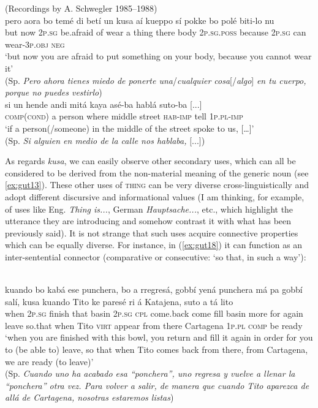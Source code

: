 \documentclass[output=paper,colorlinks,citecolor=brown]{langscibook}
\begin{document}
\ea\label{ex:gut16}(Recordings by A. Schwegler 1985--1988)\\
\gll pero aora bo temé di betí un kusa aí kueppo sí pokke bo polé biti-lo nu \\
but now 2\textsc{p.sg} be.afraid of wear a thing there body 2\textsc{p.sg.poss} because 2\textsc{p.sg} can wear-3\textsc{p.obj} \textsc{neg} \\
\glt ‘but now you are afraid to put something on your body, because you cannot wear it’ \\
(Sp. \textit{Pero ahora tienes miedo de ponerte una}/\textit{cualquier cosa}[/\textit{algo}] \textit{en tu cuerpo, porque no puedes vestirlo}) 
\ex \label{ex:gut17}\citep[209]{MagliaMoñino2015}\\
\gll si un hende andi mitá kaya asé-ba hablá suto-ba [...] \\
\textsc{comp}(\textsc{cond}) a person where middle street \textsc{hab-imp} tell 1\textsc{p.pl-imp} \\
\glt ‘if a person(/someone) in the middle of the street spoke to us, […]’ \\
(Sp. \textit{Si alguien en medio de la calle nos hablaba, }[...]) 
\z

As regards \textit{kusa}, we can easily observe other secondary uses, which can all be considered to be derived from the non-material meaning of the generic noun (see \ref{ex:gut13}). These other uses of \textsc{thing} can be very diverse cross-linguistically and adopt different discursive and informational values (I am thinking, for example, of uses like Eng. \textit{Thing is...}, German \textit{Hauptsache...}, etc., which highlight the utterance they are introducing and somehow contrast it with what has been previously said). It is not strange that such uses acquire connective properties which can be equally diverse. For instance, in (\ref{ex:gut18}) it can function as an inter-sentential connector (comparative or consecutive: ‘so that, in such a way’): 

\ea\label{ex:gut18}\citep[203]{FriedemannRosselli1983}\\
\gll kuando bo kabá ese punchera, bo a rregresá, gobbí yená punchera má pa gobbí salí, kusa kuando Tito ke paresé ri á Katajena, suto a tá lito \\
when 2\textsc{p.sg} finish that basin 2\textsc{p.sg} \textsc{cpl} come.back come fill basin more for again leave so.that when Tito \textsc{virt} appear from there Cartagena 1\textsc{p.pl} \textsc{comp} be ready \\
\glt ‘when you are finished with this bowl, you return and fill it again in order for you to (be able to) leave, so that when Tito comes back from there, from Cartagena, we are ready (to leave)’ \\
(Sp. \textit{Cuando uno ha acabado esa “ponchera”, uno regresa y vuelve a llenar la “ponchera” otra vez. Para volver a salir, de manera que cuando Tito aparezca de allá de Cartagena, nosotras estaremos listas})
\z
\end{document}
